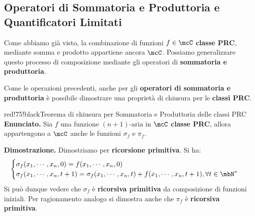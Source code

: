 \subsection{Operatori di Sommatoria e Produttoria e Quantificatori Limitati}

Come abbiamo già visto, la combinazione di funzioni \(f\in\mcC\) \textbf{classe PRC}, mediante somma e prodotto appartiene ancora \(\mcC\).
Possiamo generalizzare questo processo di composizione mediante gli operatori di \textbf{sommatoria e produttoria}.


Come le operazioni precedenti, anche per gli \textbf{operatori di sommatoria e produttoria} è possibile dimostrare una proprietà di chiusura per le \textbf{classi PRC}.

\begin{halfframedbox}{red!75!black}{Teorema di chiusura per Sommatoria e Produttoria delle classi PRC}\label{Teorema di chiusura per Sommatoria e Produttoria delle classi PRC}
  \textbf{Enunciato. } Sia \(f\) una funzione \((n+1)\text{-aria}\) in \(\mcC\) \textbf{classe PRC}, allora appartengono a \(\mcC\) anche le funzioni \(\sigma_f\) e \(\pi_f\).

  \begin{center}
    \textcolor{red!75!black}{\hdashrule[0.5ex]{18cm}{1pt}{3mm 3pt 1mm 2pt}}
  \end{center}

  \textbf{Dimostrazione. } Dimostriamo per \textbf{ricorsione primitiva}. Si ha:
  \begin{equation}
    \begin{cases}
      \sigma_f(x_1,\cdots,x_n,0)=f(x_1,\cdots,x_n,0)\\
      \sigma_f(x_1,\cdots,x_n,t+1)=\sigma_f(x_1,\cdots,x_n,t)+f(x_1,\cdots,x_n,t+1), \forall t \in \mbN^*
    \end{cases}
  \end{equation}
  Si può dunque vedere che \(\sigma_f\) è \textbf{ricorsiva primitiva} da composizione di funzioni iniziali.
  Per ragionamento analogo si dimostra anche che \(\pi_f\) è \textbf{ricorsiva primitiva}.
\end{halfframedbox}

